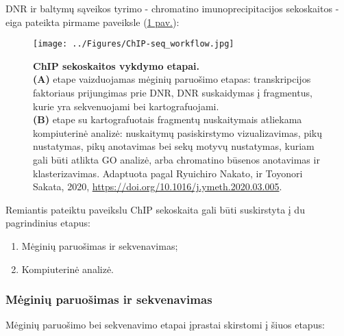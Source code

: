 \documentclass[12pt]{article}
\begin{document}

\newpage

DNR ir baltymų sąveikos tyrimo - chromatino imunoprecipitacijos sekoskaitos -
eiga pateikta pirmame paveiksle (\hyperref[fig:image1]{1 pav.}):

\begin{figure}[ht]
    \begin{center}
        \captionsetup{justification=centering}
        \texttt{[image: ../Figures/ChIP-seq\_workflow.jpg]}
        \vspace{-1\baselineskip}
        \caption{\small\textbf{ChIP sekoskaitos vykdymo etapai.}\\
            \textbf{(A)} etape vaizduojamas mėginių paruošimo etapas:
            transkripcijos faktoriaus prijungimas prie DNR, DNR suskaidymas į
            fragmentus, kurie yra sekvenuojami bei kartografuojami.\\
            \textbf{(B)} etape su kartografuotais fragmentų nuskaitymais
            atliekama kompiuterinė analizė: nuskaitymų pasiskirstymo
            vizualizavimas, pikų nustatymas, pikų anotavimas bei sekų motyvų
            nustatymas, kuriam gali būti atlikta GO analizė, arba chromatino
            būsenos anotavimas ir klasterizavimas. Adaptuota pagal Ryuichiro 
            Nakato, ir Toyonori Sakata, 2020,
            \url{https://doi.org/10.1016/j.ymeth.2020.03.005}.}
        \label{fig:image1}
    \end{center}
\end{figure}

Remiantis pateiktu paveikslu ChIP sekoskaita gali būti suskirstyta į du
pagrindinius etapus:

\begin{enumerate}
    \item Mėginių paruošimas ir sekvenavimas;
    \item Kompiuterinė analizė.
\end{enumerate}

\subsubsection{Mėginių paruošimas ir sekvenavimas}
Mėginių paruošimo bei sekvenavimo etapai įprastai skirstomi į šiuos etapus:
\end{document}
